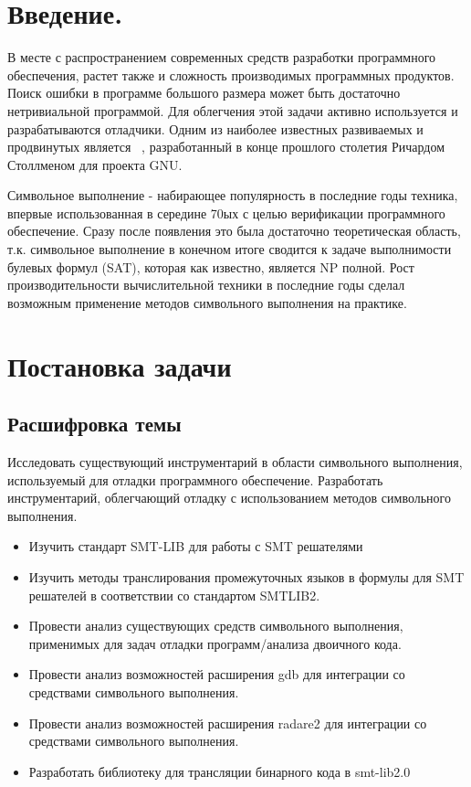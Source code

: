 
\newpage
\tableofcontents
\newpage

\bigskip
\section{Введение.}

В месте с распространением современных средств разработки программного обеспечения, растет также и сложность производимых программных продуктов. Поиск ошибки в программе большого размера может быть достаточно нетривиальной программой. Для облегчения этой задачи активно используется и разрабатываются отладчики. Одним из наиболее известных развиваемых и продвинутых является ~\cite{gdb}, разработанный в конце прошлого столетия Ричардом Столлменом для проекта GNU.

Символьное выполнение - набирающее популярность в последние годы техника, впервые использованная
в середине 70ых с целью верификации программного обеспечение. Сразу после появления это была достаточно теоретическая область, т.к. символьное выполнение в конечном итоге сводится
к задаче выполнимости булевых формул (SAT), которая как известно, является NP полной.
Рост производительности вычислительной техники в последние годы сделал возможным применение методов символьного выполнения на практике.

\section{Постановка задачи}
\subsection{Расшифровка темы}
Исследовать существующий инструментарий в области символьного выполнения, используемый для отладки программного обеспечение.
Разработать инструментарий, облегчающий отладку с использованием методов символьного выполнения.

\begin{itemize}

\item Изучить стандарт SMT-LIB\cite{smtlib} для работы с SMT решателями
\item Изучить методы транслирования промежуточных языков в формулы для SMT решателей в соответствии со стандартом SMTLIB2.
\item Провести анализ существующих средств символьного выполнения, применимых для задач отладки программ/анализа двоичного кода.
\item Провести анализ возможностей расширения gdb для интеграции со средствами символьного выполнения.
\item Провести анализ возможностей расширения radare2 для интеграции со средствами символьного выполнения.
\item Разработать библиотеку для трансляции бинарного кода в smt-lib2.0

\end{itemize}

